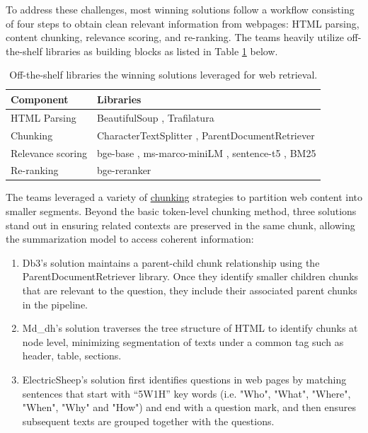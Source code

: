 To address these challenges, most winning solutions follow a workflow consisting of four steps to obtain clean relevant information from webpages: HTML parsing, content chunking, relevance scoring, and re-ranking. The teams heavily utilize off-the-shelf libraries as building blocks as listed in Table \ref{tab:tools-web} below.
\begin{table}[htbp]
\centering
\caption{Off-the-shelf libraries the winning solutions leveraged for web retrieval.}
\begin{tabular}{ll}
\toprule
\bf Component & \bf Libraries \\
\midrule
HTML Parsing & BeautifulSoup \cite{richardson2007beautiful}, Trafilatura \cite{barbaresi2021trafilatura} \\
Chunking & CharacterTextSplitter \cite{mavroudis2024langchain} , ParentDocumentRetriever \cite{mavroudis2024langchain}\\
Relevance scoring & bge-base \cite{bge_embedding}, ms-marco-miniLM \cite{ms-marco} , sentence-t5 \cite{ni2021sentence}, BM25 \cite{robertson2009probabilistic}\\
Re-ranking & bge-reranker \cite{chen2024bge}\\
\bottomrule
\end{tabular}
\label{tab:tools-web}
\end{table}

The teams leveraged a variety of \underline{chunking} strategies to partition web content into smaller segments. Beyond the basic token-level chunking method, three solutions stand out in ensuring related contexts are preserved in the same chunk, allowing the summarization model to access coherent information:
\begin{enumerate}
    \item Db3’s \cite{db3} solution maintains a parent-child chunk relationship using the ParentDocumentRetriever library. Once they identify smaller children chunks that are relevant to the question, they include their associated parent chunks in the pipeline.
    \item Md\_dh’s \cite{mddh} solution traverses the tree structure of HTML to identify chunks at node level, minimizing segmentation of texts under a common tag such as header, table, sections.
    \item ElectricSheep’s \cite{electricsheep} solution first identifies questions in web pages by matching sentences that start with ``5W1H'' key words (i.e. "Who", "What", "Where", "When", "Why" and "How") and end with a question mark, and then ensures subsequent texts are grouped together with the questions.
\end{enumerate}

